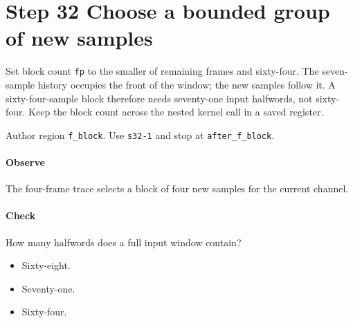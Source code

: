\section{Step 32 Choose a bounded group of new samples}\label{pcm-wav-s32}
Set block count \texttt{fp} to the smaller of remaining frames and sixty-four. The seven-sample history occupies the front of the window; the new samples follow it. A sixty-four-sample block therefore needs seventy-one input halfwords, not sixty-four. Keep the block count across the nested kernel call in a saved register.

Author region \texttt{f\_block}. Use \texttt{s32-1} and stop at \texttt{after\_f\_block}.

\paragraph{Observe} The four-frame trace selects a block of four new samples for the current channel.

\paragraph{Check} How many halfwords does a full input window contain?
\begin{itemize}
  \item[A.] Sixty-eight.
  \item[B.] Seventy-one.
  \item[C.] Sixty-four.
\end{itemize}
